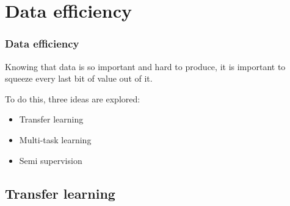 \documentclass[10pt]{beamer}
\begin{document}








\section{Data efficiency}

\begin{frame}
  \frametitle{Data efficiency}

  Knowing that data is so important and hard to produce, it is
  important to squeeze every last bit of value out of it.

  \bigskip

  To do this, three ideas are explored:
  \begin{itemize}
    \item Transfer learning
    \item Multi-task learning
    \item Semi supervision
  \end{itemize}

\end{frame}

\subsection{Transfer learning}
\end{document}
